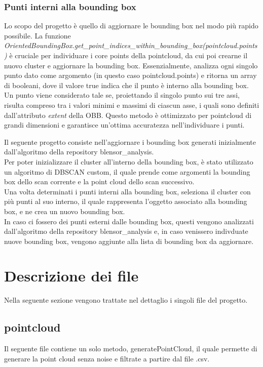 \documentclass[italian]{article}
\begin{document}
\subsubsection*{Punti interni alla bounding box}
Lo scopo del progetto è quello di aggiornare le bounding box nel modo più rapido possibile. La funzione \textit{OrientedBoundingBox.get\_point\_indices\_within\_bounding\_box(pointcloud.points)} è cruciale per individuare i core points della pointcloud, da cui poi crearne il nuovo cluster e aggiornare la bounding box. Essenzialmente, analizza ogni singolo punto dato come argomento (in questo caso pointcloud.points) e ritorna un array di booleani, dove il valore true indica che il punto è interno alla bounding box. Un punto viene considerato tale se, proiettando il singolo punto sui tre assi, risulta compreso tra i valori minimi e massimi di ciascun asse, i quali sono definiti dall'attributo \textit{extent} della OBB.
Questo metodo è ottimizzato per pointcloud di grandi dimensioni e garantisce un'ottima accuratezza nell'individuare i punti.


Il seguente progetto consiste nell'aggiornare i bounding box generati inizialmente dall'algoritmo della repository blensor\_analysis.\\
Per poter inizializzare il cluster all'interno della bounding box, è stato utilizzato un algoritmo di DBSCAN custom, il quale prende come argomenti la bounding box dello scan corrente e la point cloud dello scan successivo.\\
Una volta determinati i punti interni alla bounding box, seleziona il cluster con più punti al suo interno, il quale rappresenta l'oggetto associato alla bounding box, e ne crea un nuovo bounding box.\\
In caso ci fossero dei punti esterni dalle bounding box, questi vengono analizzati dall'algoritmo della repository blensor\_analysis e, in caso venissero indivduate nuove bounding box, vengono aggiunte alla lista di bounding box da aggiornare.\\
\section{Descrizione dei file}
Nella seguente sezione vengono trattate nel dettaglio i singoli file del progetto.
\subsection{pointcloud}
Il seguente file contiene un solo metodo, generatePointCloud, il quale permette di generare la point cloud senza noise e filtrate a partire dal file .csv.\\
\end{document}
